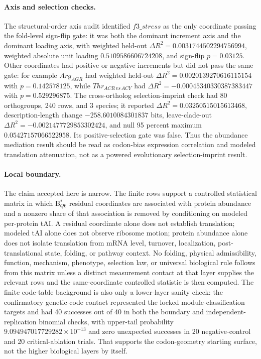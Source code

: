 \paragraph{Axis and selection checks.}
The structural-order axis audit identified $f3\_stress$ as the only coordinate passing the fold-level sign-flip gate: it was both the dominant increment axis and the dominant loading axis, with weighted held-out $\Delta R^2=0.0031744502294756994$, weighted absolute unit loading $0.5109586606724208$, and sign-flip $p=0.03125$.  Other coordinates had positive or negative increments but did not pass the same gate: for example $Arg_{AGR}$ had weighted held-out $\Delta R^2=0.0020139270616115154$ with $p=0.142578125$, while $Thr_{ACR\,vs\,ACY}$ had $\Delta R^2=-0.00045340330387383447$ with $p=0.529296875$.  The cross-ortholog selection-imprint check had 80 orthogroups, 240 rows, and 3 species; it reported $\Delta R^2=0.03250515015613468$, description-length change $-258.6010084301837$ bits, leave-clade-out $\Delta R^2=-0.0021477729853302424$, and null 95 percent maximum $0.05427157066522958$.  Its positive-selection gate was false.  Thus the abundance mediation result should be read as codon-bias expression correlation and modeled translation attenuation, not as a powered evolutionary selection-imprint result.

\paragraph{Local boundary.}
The claim accepted here is narrow.  The finite rows support a controlled statistical matrix in which B$^{\ast}_{Q6}$ residual coordinates are associated with protein abundance and a nonzero share of that association is removed by conditioning on modeled per-protein tAI.  A residual coordinate alone does not establish translation; modeled tAI alone does not observe ribosome motion; protein abundance alone does not isolate translation from mRNA level, turnover, localization, post-translational state, folding, or pathway context.  No folding, physical admissibility, function, mechanism, phenotype, selection law, or universal biological rule follows from this matrix unless a distinct measurement contact at that layer supplies the relevant rows and the same-coordinate controlled statistic is then computed.  The finite code-table background is also only a lower-layer sanity check: the confirmatory genetic-code contact represented the locked module-classification targets and had 40 successes out of 40 in both the boundary and independent-replication binomial checks, with upper-tail probability $9.094947017729282\times 10^{-13}$ and zero unexpected successes in 20 negative-control and 20 critical-ablation trials.  That supports the codon-geometry starting surface, not the higher biological layers by itself.

